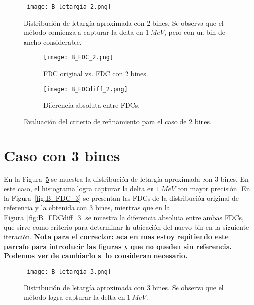 \begin{figure}[H]
    \centering
    \texttt{[image: B\_letargia\_2.png]}
    \caption{Distribución de letargía aproximada con 2 bines. Se observa que el método comienza a capturar la delta en $1~MeV$, pero con un bin de ancho considerable.}
    \label{fig:B_letargia_2}
\end{figure}

\begin{figure}[H]
    \centering
    \begin{subfigure}[b]{0.46\textwidth}
        \texttt{[image: B\_FDC\_2.png]}
        \caption{FDC original vs. FDC con 2 bines.}
        \label{fig:B_FDC_2}
    \end{subfigure}
    \hfill
    \begin{subfigure}[b]{0.46\textwidth}
        \texttt{[image: B\_FDCdiff\_2.png]}
        \caption{Diferencia absoluta entre FDCs.}
        \label{fig:B_FDCdiff_2}
    \end{subfigure}
    \caption{Evaluación del criterio de refinamiento para el caso de 2 bines.}
    \label{fig:B_FDC_2_2}
\end{figure}

\section*{Caso con 3 bines}

En la Figura~\ref{fig:B_letargia_3} se muestra la distribución de letargía aproximada con 3 bines. En este caso, el histograma logra capturar la delta en $1~MeV$ con mayor precisión. En la Figura~\ref{fig:B_FDC_3} se presentan las FDCs de la distribución original de referencia y la obtenida con 3 bines, mientras que en la Figura~\ref{fig:B_FDCdiff_3} se muestra la diferencia absoluta entre ambas FDCs, que sirve como criterio para determinar la ubicación del nuevo bin en la siguiente iteración. \textbf{Nota para el corrector: aca en mas estoy repitiendo este parrafo para introducir las figuras y que no queden sin referencia. Podemos ver de cambiarlo si lo consideran necesario.}

\begin{figure}[H]
    \centering
    \texttt{[image: B\_letargia\_3.png]}
    \caption{Distribución de letargía aproximada con 3 bines. Se observa que el método logra capturar la delta en $1~MeV$.}
    \label{fig:B_letargia_3}
\end{figure}

